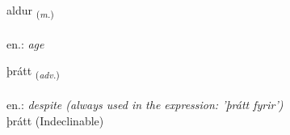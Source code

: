 \documentclass[frontgrid, backgrid]{flacards}\usepackage[]{graphicx}\usepackage[]{xcolor}
\begin{document}
\renewcommand{\blhead}{\vskip5pt {\small\bfseries\footnotesize Nafnorð | Noun }}
\renewcommand{\bcfoot}{\vskip5pt \hspace{2pt}{\small\bfseries\footnotesize 1K}}


{aldur \small{\textsubscript{(\textit{m.})}} \\[1ex] %
\textphonetic{[altʏr]} \\
en.: \emph{age} \\  [2ex]
\renewcommand*{\arraystretch}{0.8}
}


\renewcommand{\flhead}{\vskip5pt \fboxsep=0pt {\small\bfseries\footnotesize Atviksorð | Adverb}}
\renewcommand{\fcfoot}{\vskip5pt \fboxsep=0pt \hspace{2pt}{\small\bfseries\footnotesize 1K}}

\renewcommand{\blhead}{\vskip5pt {\small\bfseries\footnotesize Atviksorð | Adverb }}
\renewcommand{\bcfoot}{\vskip5pt \hspace{2pt}{\small\bfseries\footnotesize 1K}}


{þrátt \small{\textsubscript{(\textit{adv.})}} \\[1ex]
\textphonetic{[θrauht]} \\
en.: \emph{despite (always used in the expression: 'þrátt fyrir')} \\  [2ex]
þrátt (Indeclinable)}

\renewcommand{\flhead}{\vskip5pt \fboxsep=0pt {\small\bfseries\footnotesize Lýsingarorð | Adjective}}
\renewcommand{\fcfoot}{\vskip5pt \fboxsep=0pt \hspace{2pt}{\small\bfseries\footnotesize 1K}}

\renewcommand{\blhead}{\vskip5pt {\small\bfseries\footnotesize Lýsingarorð | Adjective }}
\renewcommand{\bcfoot}{\vskip5pt \hspace{2pt}{\small\bfseries\footnotesize 1K}}
\end{document}
